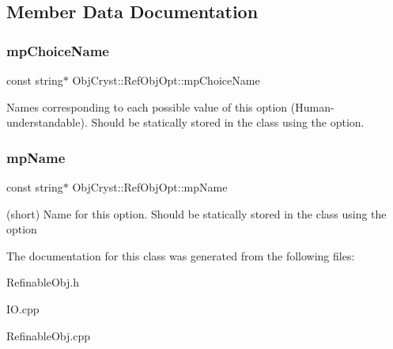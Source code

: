 \subsection{Member Data Documentation}
\mbox{\label{class_obj_cryst_1_1_ref_obj_opt_abc47d0f345c4121b6492e754b30f4fef}} 
\subsubsection{\texorpdfstring{mpChoiceName}{mpChoiceName}}
{\footnotesize\ttfamily const string$\ast$ Obj\+Cryst\+::\+Ref\+Obj\+Opt\+::mp\+Choice\+Name\hspace{0.3cm}{\ttfamily [protected]}}

Names corresponding to each possible value of this option (Human-\/understandable). Should be statically stored in the class using the option. \mbox{\label{class_obj_cryst_1_1_ref_obj_opt_a45eb6eed7f6578f438433acddb2f1eb2}} 
\subsubsection{\texorpdfstring{mpName}{mpName}}
{\footnotesize\ttfamily const string$\ast$ Obj\+Cryst\+::\+Ref\+Obj\+Opt\+::mp\+Name\hspace{0.3cm}{\ttfamily [protected]}}

(short) Name for this option. Should be statically stored in the class using the option 

The documentation for this class was generated from the following files\+:\begin{DoxyCompactItemize}
\item 
Refinable\+Obj.\+h\item 
I\+O.\+cpp\item 
Refinable\+Obj.\+cpp\end{DoxyCompactItemize}
